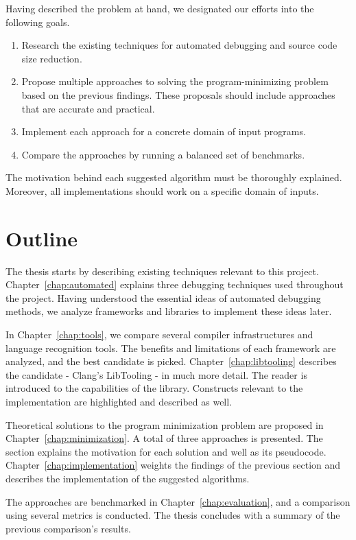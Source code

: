 Having described the problem at hand, we designated our efforts into 
the following goals.
\begin{enumerate}
  \item Research the existing techniques for automated debugging and source 
  code size reduction.
  \item Propose multiple approaches to solving the program-minimizing problem based 
  on the previous findings. 
  These proposals should include approaches that are accurate and practical.
  \item Implement each approach for a concrete domain of input programs.
  \item Compare the approaches by running a balanced set of benchmarks.
\end{enumerate}
The motivation behind each suggested algorithm must be thoroughly explained. 
Moreover, all implementations should work on a specific domain of inputs.

\section{Outline}

The thesis starts by describing existing techniques relevant to this project. 
Chapter~\ref{chap:automated} explains three debugging techniques used 
throughout the project. 
Having understood the essential ideas of automated debugging methods, we 
analyze frameworks and libraries to implement these ideas later. 

In Chapter~\ref{chap:tools}, we compare several compiler infrastructures and 
language recognition tools. 
The benefits and limitations of each framework are analyzed, and the best 
candidate is picked. 
Chapter~\ref{chap:libtooling} describes the candidate - Clang's LibTooling - 
in much more detail. 
The reader is introduced to the capabilities of the library. 
Constructs relevant to the implementation are highlighted and described as 
well. 

Theoretical solutions to the program minimization problem are proposed in 
Chapter~\ref{chap:minimization}.
A total of three approaches is presented. 
The section explains the motivation for each solution and well as its 
pseudocode. 
Chapter~\ref{chap:implementation} weights the findings of the previous 
section and describes the implementation of the suggested algorithms. 

The approaches are benchmarked in Chapter~\ref{chap:evaluation}, and 
a comparison using several metrics is conducted. 
The thesis concludes with a summary of the previous comparison's results.

